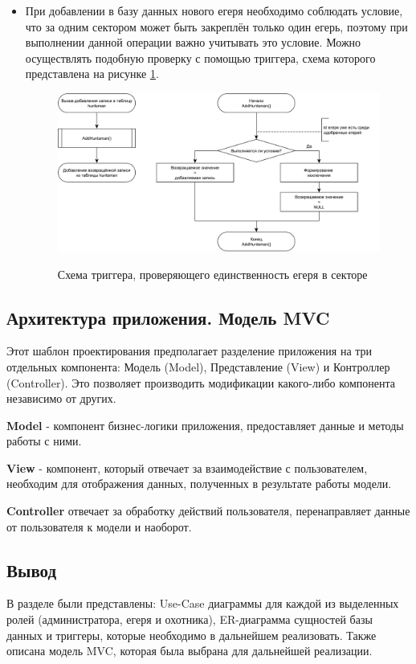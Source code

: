 \begin{itemize}
		\item При добавлении в базу данных нового егеря необходимо соблюдать условие, что за одним сектором может быть закреплён только один егерь, поэтому при выполнении данной операции важно учитывать это условие. Можно осуществлять подобную проверку с помощью триггера, схема которого представлена на рисунке \ref{fig38:image}.
		
		\begin{figure}[h!]
			\centering
			\begin{center}
				{\includegraphics[scale=0.45]{schemes/trigger_addhuntsman.pdf}}
				\caption{Схема триггера, проверяющего единственность егеря в секторе}
				\label{fig38:image}
			\end{center}
		\end{figure}
		
		
	\end{itemize}

	\subsection{Архитектура приложения. Модель MVC}
	Этот шаблон проектирования предполагает разделение приложения на три отдельных компонента: Модель (Model), Представление (View) и Контроллер (Controller). Это позволяет производить модификации какого-либо компонента независимо от других. \cite{mvc} 
	
	\textbf{Model} - компонент бизнес-логики приложения, предоставляет данные и методы работы с ними.
	
	\textbf{View} - компонент, который отвечает за взаимодействие с пользователем, необходим для отображения данных, полученных в результате работы модели.
	
	\textbf{Controller} отвечает за обработку действий пользователя, перенаправляет данные от пользователя к модели и наоборот.\\
	
	\subsection*{Вывод}
	В разделе были представлены: Use-Case диаграммы для каждой из выделенных ролей (администратора, егеря и охотника), ER-диаграмма сущностей базы данных и триггеры, которые необходимо в дальнейшем реализовать. Также описана модель MVC, которая была выбрана для дальнейшей реализации. 




	
	